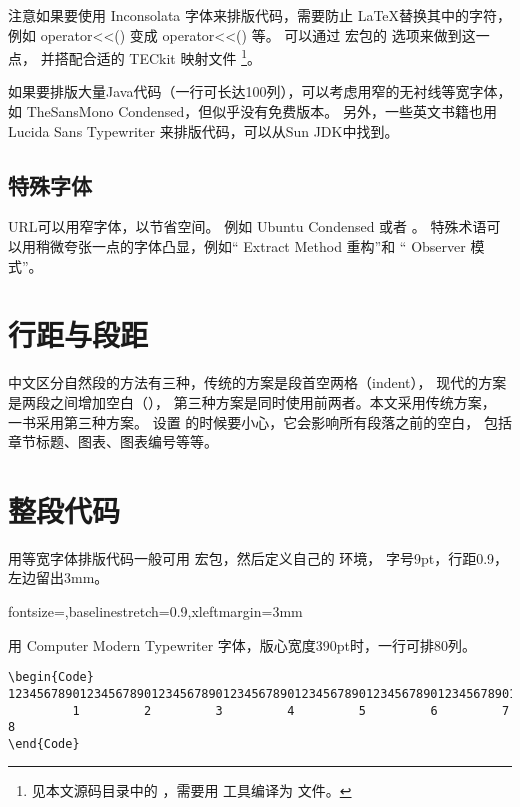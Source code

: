 注意如果要使用 Inconsolata 字体来排版代码，需要防止 \LaTeX 替换其中的字符，
例如 { operator<<()} 变成 { operator<<()} 等。
可以通过  宏包的  选项来做到这一点，
并搭配合适的 TECkit 映射文件
\footnote{见本文源码目录中的 ，需要用  工具编译为  文件。}。

如果要排版大量Java代码（一行可长达100列），可以考虑用窄的无衬线等宽字体，
如 TheSansMono Condensed，但似乎没有免费版本。
另外，一些英文书籍也用 Lucida Sans Typewriter 来排版代码，可以从Sun JDK中找到。

\subsection{特殊字体}
URL可以用窄字体，以节省空间。
例如 {Ubuntu Condensed} 或者 。
特殊术语可以用稍微夸张一点的字体凸显，例如“{ Extract Method} 重构”和
“{ Observer} 模式”。

\section{行距与段距}
中文区分自然段的方法有三种，传统的方案是段首空两格（indent），
现代的方案是两段之间增加空白（），
第三种方案是同时使用前两者。本文采用传统方案，
\mybooktitle 一书采用第三种方案。
设置 的时候要小心，它会影响所有段落之前的空白，
包括章节标题、图表、图表编号等等。

\section{整段代码}
用等宽字体排版代码一般可用  宏包，然后定义自己的 环境，
字号9pt，行距0.9，左边留出3mm。
\begin{Code}
%
  {fontsize=\small,baselinestretch=0.9,xleftmargin=3mm}
\end{Code}

用 { Computer Modern Typewriter} 字体，版心宽度390pt时，一行可排80列。
\begin{Verbatim}[fontsize=\small,baselinestretch=0.9,xleftmargin=3mm]
\begin{Code}
12345678901234567890123456789012345678901234567890123456789012345678901234567890
         1         2         3         4         5         6         7         8
\end{Code}
\end{Verbatim}

